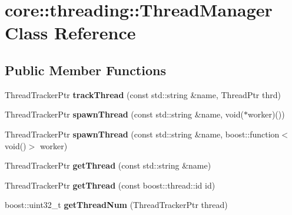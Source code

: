 \hypertarget{classcore_1_1threading_1_1_thread_manager}{\section{core\-:\-:threading\-:\-:Thread\-Manager Class Reference}
\label{classcore_1_1threading_1_1_thread_manager}
}
\subsection*{Public Member Functions}
\begin{DoxyCompactItemize}
\item 
\hypertarget{classcore_1_1threading_1_1_thread_manager_a6df284ef1b6563510648cba05f49a5cb}{Thread\-Tracker\-Ptr {\bfseries track\-Thread} (const std\-::string \&name, Thread\-Ptr thrd)}\label{classcore_1_1threading_1_1_thread_manager_a6df284ef1b6563510648cba05f49a5cb}

\item 
\hypertarget{classcore_1_1threading_1_1_thread_manager_acf4e3f0a96177d0fc0978ed237d3c27c}{Thread\-Tracker\-Ptr {\bfseries spawn\-Thread} (const std\-::string \&name, void($\ast$worker)())}\label{classcore_1_1threading_1_1_thread_manager_acf4e3f0a96177d0fc0978ed237d3c27c}

\item 
\hypertarget{classcore_1_1threading_1_1_thread_manager_a8c9aef84570d00804f737a0e44c4fe3d}{Thread\-Tracker\-Ptr {\bfseries spawn\-Thread} (const std\-::string \&name, boost\-::function$<$ void()$>$ worker)}\label{classcore_1_1threading_1_1_thread_manager_a8c9aef84570d00804f737a0e44c4fe3d}

\item 
\hypertarget{classcore_1_1threading_1_1_thread_manager_a8d100f6f5fd710b75c374bf85da5c9bd}{Thread\-Tracker\-Ptr {\bfseries get\-Thread} (const std\-::string \&name)}\label{classcore_1_1threading_1_1_thread_manager_a8d100f6f5fd710b75c374bf85da5c9bd}

\item 
\hypertarget{classcore_1_1threading_1_1_thread_manager_a0de12a98bab0d13c24a256aadf65da1c}{Thread\-Tracker\-Ptr {\bfseries get\-Thread} (const boost\-::thread\-::id id)}\label{classcore_1_1threading_1_1_thread_manager_a0de12a98bab0d13c24a256aadf65da1c}

\item 
\hypertarget{classcore_1_1threading_1_1_thread_manager_a13ac56eaabfe83b5ffb8019393021e55}{boost\-::uint32\-\_\-t {\bfseries get\-Thread\-Num} (Thread\-Tracker\-Ptr thread)}\label{classcore_1_1threading_1_1_thread_manager_a13ac56eaabfe83b5ffb8019393021e55}


\end{DoxyCompactItemize}
